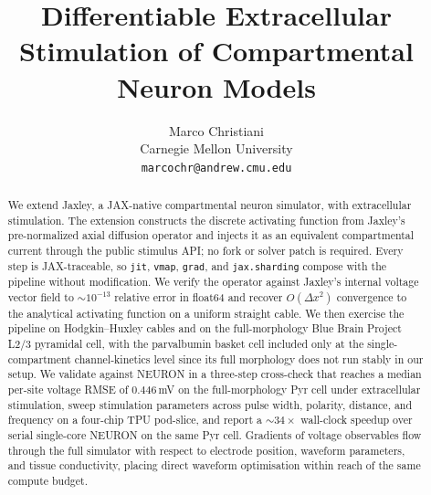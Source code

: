 \documentclass{article}
\title{Differentiable Extracellular Stimulation
of Compartmental Neuron Models}
\author{%
  Marco Christiani \\
  Carnegie Mellon University \\
  \texttt{marcochr@andrew.cmu.edu}
}
\begin{document}
\maketitle

\begin{abstract}
We extend Jaxley, a JAX-native compartmental neuron simulator, with
extracellular stimulation. The extension constructs the discrete activating
function from Jaxley's pre-normalized axial diffusion operator and injects it
as an equivalent compartmental current through the public stimulus API; no
fork or solver patch is required. Every step is JAX-traceable, so
\texttt{jit}, \texttt{vmap}, \texttt{grad}, and \texttt{jax.sharding} compose
with the pipeline without modification. We verify the operator against
Jaxley's internal voltage vector field to $\sim\!10^{-13}$ relative error in
float64 and recover $O(\Delta x^2)$ convergence to the analytical activating
function on a uniform straight cable. We then exercise the pipeline on
Hodgkin--Huxley cables and on the full-morphology Blue Brain Project
L2/3 pyramidal cell, with the parvalbumin basket cell included only at
the single-compartment channel-kinetics level since its full
morphology does not run stably in our setup. We validate against
NEURON in a three-step cross-check that reaches a median per-site
voltage RMSE of $0.446\,$mV on the full-morphology Pyr cell under
extracellular stimulation, sweep stimulation parameters across pulse
width, polarity, distance, and frequency on a four-chip TPU pod-slice,
and report a $\sim\!34\times$ wall-clock speedup over serial
single-core NEURON on the same Pyr cell. Gradients
of voltage observables flow through the full simulator with respect to
electrode position, waveform parameters, and tissue conductivity,
placing direct waveform optimisation within reach of the same compute
budget.
\end{abstract}














\appendix





\end{document}
